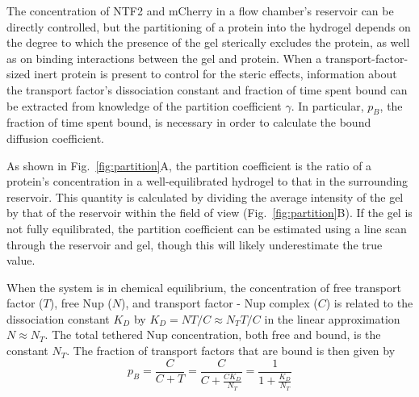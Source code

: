 The concentration of NTF2 and mCherry in a flow chamber's reservoir can be directly controlled, but the partitioning of a protein into the hydrogel depends on the degree to which the presence of the gel sterically excludes the protein, as well as on binding interactions between the gel and protein.  When a transport-factor-sized inert protein is present to control for the steric effects, information about the transport factor's dissociation constant and fraction of time spent bound can be extracted from knowledge of the partition coefficient $\gamma$.  In particular, $p_B$, the fraction of time spent bound, is necessary in order to calculate the bound diffusion coefficient.

As shown in Fig.~\ref{fig:partition}A, the partition coefficient is the ratio of a protein's concentration in a well-equilibrated hydrogel to that in the surrounding reservoir.  This quantity is calculated by dividing the average intensity of the gel by that of the reservoir within the field of view (Fig.~\ref{fig:partition}B).  If the gel is not fully equilibrated, the partition coefficient can be estimated using a line scan through the reservoir and gel, though this will likely underestimate the true value.

When the system is in chemical equilibrium, the concentration of free transport factor ($T$), free Nup ($N$), and transport factor - Nup complex ($C$) is related to the dissociation constant $K_D$ by
$K_D = NT/C \approx N_TT/C$ in the linear approximation $N \approx N_T$.   The total tethered Nup concentration, both free and bound, is the constant $N_T$.  The fraction of transport factors that are bound is then given by
\begin{equation}
p_B = \frac{C}{C+T} = \frac{C}{C+\frac{CK_D}{N_T}} = \frac{1}{1+\frac{K_D}{N_T}} %
\label{eq:bound-prob}
\end{equation} %

